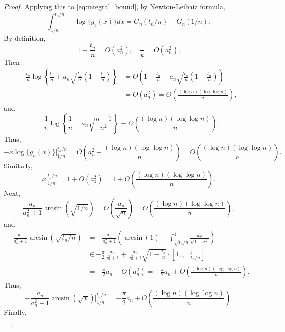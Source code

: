 \documentclass[11pt]{article}
\newcommand{\lb}{\left(}
\newcommand{\rb}{\right)}
\begin{document}
\begin{proof}
  Applying this to \eqref{eq:integral_bound}, by Newton-Leibniz formula,
  \[\int_{1/n}^{t_n / n}-\log \{g_n(x)\}dx = G_n(t_n / n) - G_n(1 / n).\]
  By definition,
  \[1 - \frac{t_n}{n} = O(a_n^2), \quad \frac{1}{n} = O\lb a_n^2\rb.\]
  Then
  \begin{align*}
    -\frac{t_n}{n}\log\left\{\frac{t_n}{n} + a_n \sqrt{\frac{t_n}{n}}\lb 1 - \frac{t_n}{n}\rb\right\} &= O\lb 1 - \frac{t_n}{n} - a_n \sqrt{\frac{t_n}{n}}\lb 1 - \frac{t_n}{n}\rb\rb\\
    & = O(a_n^2) = O\lb\frac{(\log n)(\log \log n)}{n}\rb,
  \end{align*}
  and
  \begin{equation*}
    -\frac{1}{n}\log\left\{\frac{1}{n} + a_n\sqrt{\frac{n-1}{n^2}}\right\} = O\lb\frac{(\log n)(\log\log n)}{n}\rb.
  \end{equation*}
  Thus,
  \begin{equation}
    \label{eq:integral_1}
    -x\log \{g_n(x)\}\bigg|_{1/n}^{t_n/n} = O\lb a_n^2 + \frac{(\log n)(\log\log n)}{n}\rb =O\lb\frac{(\log n)(\log\log n)}{n}\rb.
  \end{equation}
  Similarly,
  \begin{equation}
    \label{eq:integral_2}
    x\bigg|_{1/n}^{t_n/n} = 1 + O\lb a_n^2\rb = 1 + O\lb\frac{(\log n)(\log\log n)}{n}\rb.
  \end{equation}
  Next, 
  \begin{equation*}
    \frac{a_n}{a_n^2 + 1}\arcsin(\sqrt{1/n}) = O\lb\frac{a_n}{\sqrt{n}}\rb = O\lb\frac{(\log n)(\log\log n)}{n}\rb,
  \end{equation*}
  and
  \begin{align}
    -\frac{a_n}{a_n^2 + 1}\arcsin(\sqrt{t_n/n}) &= -\frac{a_n}{a_n^2+1}\lb \arcsin(1) - \int_{\sqrt{t_n/n}}^{1}\frac{dx}{\sqrt{1 - x^2}}\rb\nonumber\\
                              &\in -\frac{\pi}{2}\frac{a_n}{a_n^2 + 1} + \frac{a_n}{a_n^2 + 1}\sqrt{1 - \frac{t_n}{n}}\cdot \left[ 1, \frac{1}{1 - t_n / n}\right]\nonumber\\
    & = -\frac{\pi}{2}a_n + O(a_n^2) = -\frac{\pi}{2}a_n + O\lb\frac{(\log n)(\log\log n)}{n}\rb.\nonumber\label{eq:integral_4}
  \end{align}
  Thus,
  \begin{equation}
    \label{eq:integral_3}
    -\frac{a_n}{a_n^2 + 1}\arcsin(\sqrt{x})\bigg|_{1/n}^{t_n/n} = -\frac{\pi}{2}a_n + O\lb \frac{(\log n)(\log\log n)}{n}\rb.
  \end{equation}
  Finally,
  \begin{align*}

\end{align*}
\end{proof}
\end{document}
